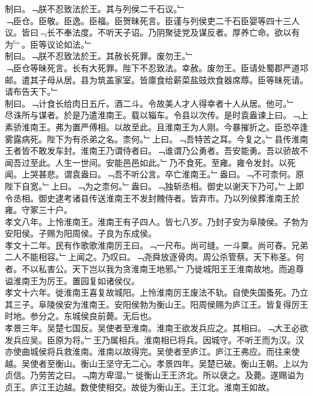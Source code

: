 \documentclass{zhvt-classic}
\begin{document}
\hspace*{2em}制曰。﹁朕不忍致法於王。其与列侯二千石议。﹂\\
\hspace*{2em}﹁臣仓。臣敬。臣逸。臣福。臣贺昧死言。臣谨与列侯吏二千石臣婴等四十三人议。皆曰﹃长不奉法度。不听天子诏。乃阴聚徒党及谋反者。厚养亡命。欲以有为﹄。臣等议论如法。﹂\\
\hspace*{2em}制曰。﹁朕不忍致法於王。其赦长死罪。废勿王。﹂\\
\hspace*{2em}﹁臣仓等昧死言。长有大死罪。陛下不忍致法。幸赦。废勿王。臣请处蜀郡严道邛邮。遣其子母从居。县为筑盖家室。皆廪食给薪菜盐豉炊食器席蓐。臣等昧死请。请布告天下。﹂\\
\hspace*{2em}制曰。﹁计食长给肉日五斤。酒二斗。令故美人才人得幸者十人从居。他可。﹂\\
\hspace*{2em}尽诛所与谋者。於是乃遣淮南王。载以辎车。令县以次传。是时袁盎谏上曰。﹁上素骄淮南王。弗为置严傅相。以故至此。且淮南王为人刚。今暴摧折之。臣恐卒逢雾露病死。陛下为有杀弟之名。柰何。﹂上曰。﹁吾特苦之耳。今复之。﹂县传淮南王者皆不敢发车封。淮南王乃谓侍者曰。﹁谁谓乃公勇者。吾安能勇。吾以骄故不闻吾过至此。人生一世间。安能邑邑如此。﹂乃不食死。至雍。雍令发封。以死闻。上哭甚悲。谓袁盎曰。﹁吾不听公言。卒亡淮南王。﹂盎曰。﹁不可柰何。原陛下自宽。﹂上曰。﹁为之柰何。﹂盎曰。﹁独斩丞相。御史以谢天下乃可。﹂上即令丞相。御史逮考诸县传送淮南王不发封餽侍者。皆弃市。乃以列侯葬淮南王於雍。守冢三十户。\\
\hspace*{2em}孝文八年。上怜淮南王。淮南王有子四人。皆七八岁。乃封子安为阜陵侯。子勃为安阳侯。子赐为阳周侯。子良为东成侯。\\
\hspace*{2em}孝文十二年。民有作歌歌淮南厉王曰。﹁一尺布。尚可缝。一斗粟。尚可舂。兄弟二人不能相容。﹂上闻之。乃叹曰。﹁尧舜放逐骨肉。周公杀管蔡。天下称圣。何者。不以私害公。天下岂以我为贪淮南王地邪。﹂乃徙城阳王王淮南故地。而追尊谥淮南王为厉王。置园复如诸侯仪。\\
\hspace*{2em}孝文十六年。徙淮南王喜复故城阳。上怜淮南厉王废法不轨。自使失国蚤死。乃立其三子。阜陵侯安为淮南王。安阳侯勃为衡山王。阳周侯赐为庐江王。皆复得厉王时地。参分之。东城侯良前薨。无后也。\\
\hspace*{2em}孝景三年。吴楚七国反。吴使者至淮南。淮南王欲发兵应之。其相曰。﹁大王必欲发兵应吴。臣原为将。﹂王乃属相兵。淮南相已将兵。因城守。不听王而为汉。汉亦使曲城侯将兵救淮南。淮南以故得完。吴使者至庐江。庐江王弗应。而往来使越。吴使者至衡山。衡山王坚守无二心。孝景四年。吴楚已破。衡山王朝。上以为贞信。乃劳苦之曰。﹁南方卑湿。﹂徙衡山王王济北。所以襃之。及薨。遂赐谥为贞王。庐江王边越。数使使相交。故徙为衡山王。王江北。淮南王如故。\\
\end{document}
